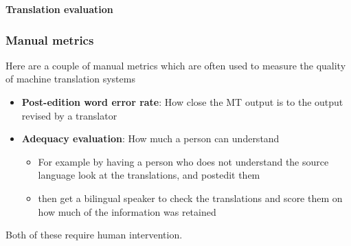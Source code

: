 \documentclass[10pt,xetex]{beamer} %
\begin{document}
%
%

\begin{frame} %
 \begin{center}
 {\Large {\bf Translation evaluation}} %
 \end{center}
\end{frame}

\begin{frame}
  \frametitle{Manual metrics}

Here are a couple of manual metrics which are often used to measure the 
quality of machine translation systems

\begin{itemize}
  \item {\bf Post-edition word error rate}: How close the MT output is to the 
    output revised by a translator
  \item {\bf Adequacy evaluation}: How much a person can understand
  \begin{itemize}
    \item For example by having a person who does not understand the 
      source language look at the translations, and postedit them
    \item then get a bilingual speaker to check the translations
      and score them on how much of the information was retained
  \end{itemize}
\end{itemize}

Both of these require human intervention.

\end{frame}
\end{document}
